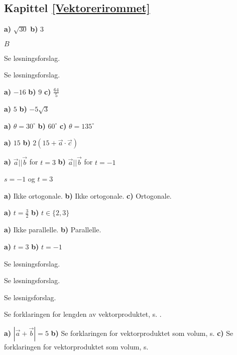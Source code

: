 



\subsection*{Kapittel \ref{Vektorerirommet}}
\footnotesize
{} \textbf{a)} $ \sqrt{30} $ \textbf{b)} $ 3 $

 $ B $

 Se løsningsforslag.

 Se løsningsforslag.

 \textbf{a)} $ -16 $ \textbf{b)} $ 9 $ \textbf{c)} $ \frac{64}{5} $

 \textbf{a)} $ 5 $ \textbf{b)} $ -5\sqrt{3} $

 \textbf{a)} $ \theta = 30^\circ $ \textbf{b)} $ 60^\circ $ \textbf{c)} $ \theta = 135^\circ $

 \textbf{a)} $ 15 $
\textbf{b)} $ 2(15+\vec{a}\cdot\vec{c}) $


 \textbf{a)} $ \vec{a}||\vec{b} $ for $ t=3 $ \textbf{b)} $ \vec{a}||\vec{b} $ for $ t=-1 $ 

 $ s=-1 $ og $ t=3 $

 \textbf{a)} Ikke ortogonale. \textbf{b)} Ikke ortogonale. \textbf{c)} Ortogonale.

\textbf{a)} $ t=\frac{3}{2} $ \textbf{b)} $ t\in\lbrace2, 3\rbrace $

\textbf{a)} Ikke parallelle.
\textbf{b)} Parallelle.

 \textbf{a)} $ t=3 $ \textbf{b)} $ t=-1 $

 Se løsningsforslag.

\begin{comment}
\opr{arparo} \textbf{a)}  100 \textbf{b)} 64
\end{comment}

 Se løsningsforslag.

 Se løsnigsforslag.

 Se forklaringen for lengden av vektorproduktet, s. \pageref{lengdvekforkl}.

 \textbf{a)} $ |\vec{a}+\vec{b}|=5 $ \textbf{b)} Se forklaringen for vektorproduktet som volum, s.\pageref{vekprsomvolforkl} \textbf{c)} Se forklaringen for vektorproduktet som volum, s.\pageref{vekprsomvolforkl}

